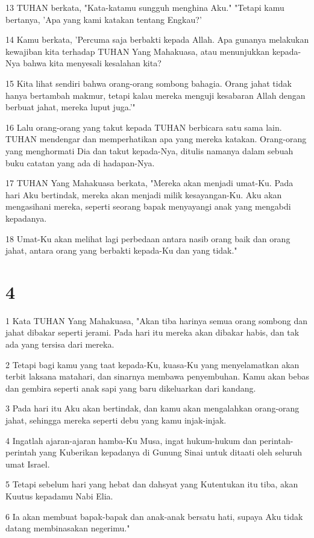\par 13 TUHAN berkata, "Kata-katamu sungguh menghina Aku." "Tetapi kamu bertanya, 'Apa yang kami katakan tentang Engkau?'
\par 14 Kamu berkata, 'Percuma saja berbakti kepada Allah. Apa gunanya melakukan kewajiban kita terhadap TUHAN Yang Mahakuasa, atau menunjukkan kepada-Nya bahwa kita menyesali kesalahan kita?
\par 15 Kita lihat sendiri bahwa orang-orang sombong bahagia. Orang jahat tidak hanya bertambah makmur, tetapi kalau mereka menguji kesabaran Allah dengan berbuat jahat, mereka luput juga.'"
\par 16 Lalu orang-orang yang takut kepada TUHAN berbicara satu sama lain. TUHAN mendengar dan memperhatikan apa yang mereka katakan. Orang-orang yang menghormati Dia dan takut kepada-Nya, ditulis namanya dalam sebuah buku catatan yang ada di hadapan-Nya.
\par 17 TUHAN Yang Mahakuasa berkata, "Mereka akan menjadi umat-Ku. Pada hari Aku bertindak, mereka akan menjadi milik kesayangan-Ku. Aku akan mengasihani mereka, seperti seorang bapak menyayangi anak yang mengabdi kepadanya.
\par 18 Umat-Ku akan melihat lagi perbedaan antara nasib orang baik dan orang jahat, antara orang yang berbakti kepada-Ku dan yang tidak."

\chapter{4}

\par 1 Kata TUHAN Yang Mahakuasa, "Akan tiba harinya semua orang sombong dan jahat dibakar seperti jerami. Pada hari itu mereka akan dibakar habis, dan tak ada yang tersisa dari mereka.
\par 2 Tetapi bagi kamu yang taat kepada-Ku, kuasa-Ku yang menyelamatkan akan terbit laksana matahari, dan sinarnya membawa penyembuhan. Kamu akan bebas dan gembira seperti anak sapi yang baru dikeluarkan dari kandang.
\par 3 Pada hari itu Aku akan bertindak, dan kamu akan mengalahkan orang-orang jahat, sehingga mereka seperti debu yang kamu injak-injak.
\par 4 Ingatlah ajaran-ajaran hamba-Ku Musa, ingat hukum-hukum dan perintah-perintah yang Kuberikan kepadanya di Gunung Sinai untuk ditaati oleh seluruh umat Israel.
\par 5 Tetapi sebelum hari yang hebat dan dahsyat yang Kutentukan itu tiba, akan Kuutus kepadamu Nabi Elia.
\par 6 Ia akan membuat bapak-bapak dan anak-anak bersatu hati, supaya Aku tidak datang membinasakan negerimu."


